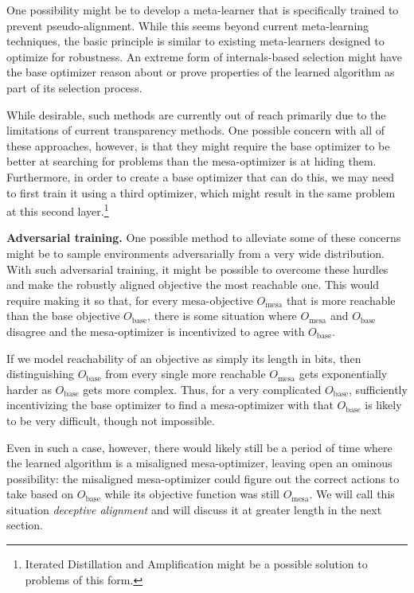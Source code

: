 \documentclass[
  onecolumn,
  natbib,
]{miri-tech-article}
\begin{document}
One possibility might be to develop a meta-learner that is specifically trained to prevent pseudo-alignment. While this seems beyond current meta-learning techniques, the basic principle is similar to existing meta-learners designed to optimize for robustness. An extreme form of internals-based selection might have the base optimizer reason about or prove properties of the learned algorithm as part of its selection process.

While desirable, such methods are currently out of reach primarily due to the limitations of current transparency methods. One possible concern with all of these approaches, however, is that they might require the base optimizer to be better at searching for problems than the mesa-optimizer is at hiding them. Furthermore, in order to create a base optimizer that can do this, we may need to first train it using a third optimizer, which might result in the same problem at this second layer.\footnote{Iterated Distillation and Amplification might be a possible solution to problems of this form.\cite{amplification}}

\textbf{Adversarial training.} One possible method to alleviate some of these concerns might be to sample environments adversarially from a very wide distribution. With such adversarial training, it might be possible to overcome these hurdles and make the robustly aligned objective the most reachable one. This would require making it so that, for every mesa-objective $O_\text{mesa}$ that is more reachable than the base objective $O_\text{base}$, there is some situation where $O_\text{mesa}$ and $O_\text{base}$ disagree and the mesa-optimizer is incentivized to agree with $O_\text{base}$.

If we model reachability of an objective as simply its length in bits, then distinguishing $O_\text{base}$ from every single more reachable $O_\text{mesa}$ gets exponentially harder as $O_\text{base}$ gets more complex. Thus, for a very complicated $O_\text{base}$, sufficiently incentivizing the base optimizer to find a mesa-optimizer with that $O_\text{base}$ is likely to be very difficult, though not impossible.

Even in such a case, however, there would likely still be a period of time where the learned algorithm is a misaligned mesa-optimizer, leaving open an ominous possibility: the misaligned mesa-optimizer could figure out the correct actions to take based on $O_\text{base}$ while its objective function was still $O_\text{mesa}$. We will call this situation \textit{deceptive alignment} and will discuss it at greater length in the next section.
\end{document}

